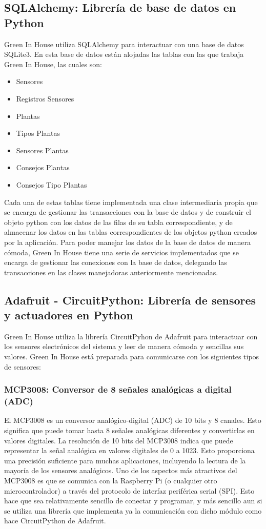     \subsection{SQLAlchemy: Librería de base de datos en Python}
    Green In House utiliza SQLAlchemy \cite{wiki:sqlalchemy} para interactuar con una base de datos SQLite3. En esta base de datos están alojadas las tablas con las que trabaja Green In House, las cuales son:
    \begin{itemize}
        \item Sensores
        \item Registros Sensores
        \item Plantas
        \item Tipos Plantas
        \item Sensores Plantas
        \item Consejos Plantas
        \item Consejos Tipo Plantas
    \end{itemize}
    Cada una de estas tablas tiene implementada una clase intermediaria propia que se encarga de gestionar las transacciones con la base de datos y de construir el objeto python con los datos de las filas de su tabla correspondiente, y de almacenar los datos en las tablas correspondientes de los objetos python creados por la aplicación. 
    Para poder manejar los datos de la base de datos de manera cómoda, Green In House tiene una serie de servicios implementados que se encarga de gestionar las conexiones con la base de datos, delegando las transacciones en las clases manejadoras anteriormente mencionadas.

    \subsection{Adafruit - CircuitPython: Librería de sensores y actuadores en Python}
    Green In House utiliza la librería CircuitPyhon de Adafruit \cite{wiki:adafruit_circuit_python} para interactuar con los sensores electrónicos del sistema y leer de manera cómoda y sencillas sus valores. Green In House está preparada para comunicarse con los siguientes tipos de sensores:
       \subsubsection{MCP3008: Conversor de 8 señales analógicas a digital (ADC)}
        El MCP3008 \cite{wiki:mcp3008} es un conversor analógico-digital (ADC) de 10 bits y 8 canales. Esto significa que puede tomar hasta 8 señales analógicas diferentes y convertirlas en valores digitales.
        La resolución de 10 bits del MCP3008 indica que puede representar la señal analógica en valores digitales de 0 a 1023. Esto proporciona una precisión suficiente para muchas aplicaciones, incluyendo la lectura de la mayoría de los sensores analógicos.
        Uno de los aspectos más atractivos del MCP3008 es que se comunica con la Raspberry Pi (o cualquier otro microcontrolador) a través del protocolo de interfaz periférica serial (SPI). Esto hace que sea relativamente sencillo de conectar y programar, y más sencillo aun si se utiliza una librería que implementa ya la comunicación con dicho módulo como hace CircuitPython de Adafruit. \cite{doc:mcp3008}

